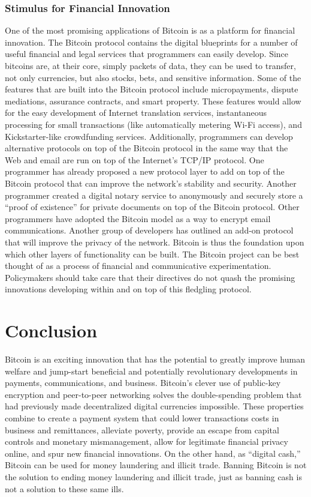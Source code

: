 \subsection{Stimulus for Financial Innovation}
One of the most promising applications of Bitcoin is as a platform
for financial innovation. The Bitcoin protocol contains the digital blueprints for a number of useful financial and legal services
that programmers can easily develop. Since bitcoins are, at
their core, simply packets of data, they can be used to transfer,
not only currencies, but also stocks, bets, and sensitive information.
Some of the features that are built into the Bitcoin protocol
include micropayments, dispute mediations, assurance contracts,
and smart property. These features would allow for the easy
development of Internet translation services, instantaneous processing
for small transactions (like automatically metering Wi-Fi
access), and Kickstarter-like crowdfunding services.
Additionally, programmers can develop alternative protocols
on top of the Bitcoin protocol in the same way that the Web
and email are run on top of the Internet’s TCP/IP protocol. One
programmer has already proposed a new protocol layer to add
on top of the Bitcoin protocol that can improve the network’s
stability and security. Another programmer created a digital
notary service to anonymously and securely store a “proof of
existence” for private documents on top of the Bitcoin protocol.
Other programmers have adopted the Bitcoin model as a way to encrypt email communications. Another group of developers
has outlined an add-on protocol that will improve the privacy
of the network. Bitcoin is thus the foundation upon which
other layers of functionality can be built. The Bitcoin project can
be best thought of as a process of financial and communicative
experimentation. Policymakers should take care that their directives
do not quash the promising innovations developing within
and on top of this fledgling protocol.

\chapter{Conclusion}

Bitcoin is an exciting innovation that has the potential to
greatly improve human welfare and jump-start beneficial and
potentially revolutionary developments in payments, communications,
and business. Bitcoin’s clever use of public-key encryption
and peer-to-peer networking solves the double-spending
problem that had previously made decentralized digital currencies
impossible. These properties combine to create a payment
system that could lower transactions costs in business and remittances,
alleviate poverty, provide an escape from capital controls
and monetary mismanagement, allow for legitimate financial
privacy online, and spur new financial innovations. On the other
hand, as “digital cash,” Bitcoin can be used for money laundering
and illicit trade. Banning Bitcoin is not the solution to ending
money laundering and illicit trade, just as banning cash is not a
solution to these same ills.

